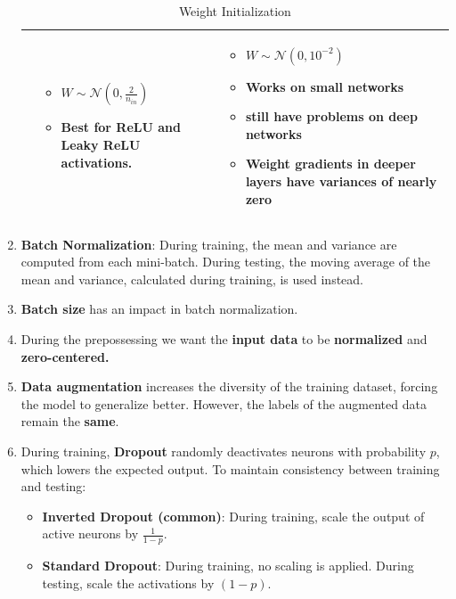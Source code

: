 \documentclass[12pt]{article}
\begin{document}
\begin{enumerate}
\begin{table}[h!]
\begin{tabular}{>{\raggedright}p{4cm}| >{\raggedright}p{4cm}| >{\raggedright\arraybackslash}p{4cm}}
        & 
        
        \begin{itemize}
            \item $W \sim \mathcal{N} \left( 0, \frac{2}{n_{in}} \right)$
            \item Best for ReLU and Leaky ReLU activations.
        \end{itemize}
        
        &
        
        \begin{itemize}
            \item $W \sim \mathcal{N}(0, 10^{-2})$
            \item Works on small networks
            \item still have problems on deep networks
            \item Weight gradients in deeper layers have variances of nearly zero
        \end{itemize}
        
        \\
        
        \bottomrule
        \end{tabular}
        \caption{Weight Initialization}
    \end{table}

    \item \textbf{Batch Normalization}: During training, the mean and variance are computed from each mini-batch. During testing, the moving average of the mean and variance, calculated during training, is used instead.

    \item \textbf{Batch size} has an impact in batch normalization.

    \item During the prepossessing we want the \textbf{input data} to be \textbf{normalized} and \textbf{zero-centered.}

    \item \textbf{Data augmentation} increases the diversity of the training dataset, forcing the model to generalize better. However, the labels of the augmented data remain the \textbf{same}.

    \item  During training, \textbf{Dropout} randomly deactivates neurons with probability $p$, which lowers the expected output. To maintain consistency between training and testing:

    \begin{itemize}
        \item \textbf{Inverted Dropout (common)}: During training, scale the output of active neurons by $\frac{1}{1 - p}$.
        \item \textbf{Standard Dropout}: During training, no scaling is applied. During testing, scale the activations by $(1 - p)$.
    \end{itemize}


\end{enumerate}
\end{document}

